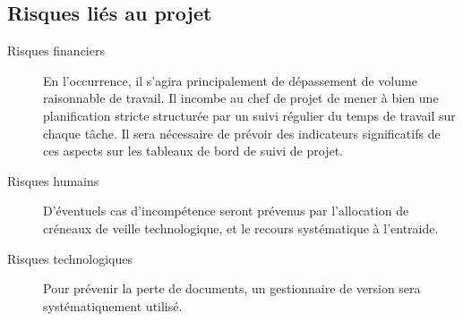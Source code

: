 \documentclass[11pt, a4paper]{article}
\begin{document}
\subsection{Risques liés au projet}

\begin{description}
    \item[Risques financiers] En l'occurrence, il s'agira principalement de
        dépassement de volume raisonnable de travail.  Il incombe au chef de
        projet de mener à bien une planification stricte structurée par un
        suivi régulier du temps de travail sur chaque tâche. Il sera nécessaire
        de prévoir des indicateurs significatifs de ces aspects sur les
        tableaux de bord de suivi de projet.
    \item[Risques humains] D'éventuels cas d'incompétence seront prévenus par
        l'allocation de créneaux de veille technologique, et le recours
        systématique à l'entraide.
    \item[Risques technologiques] Pour prévenir la perte de documents, un
        gestionnaire de version sera systématiquement utilisé.
\end{description}
\end{document}
